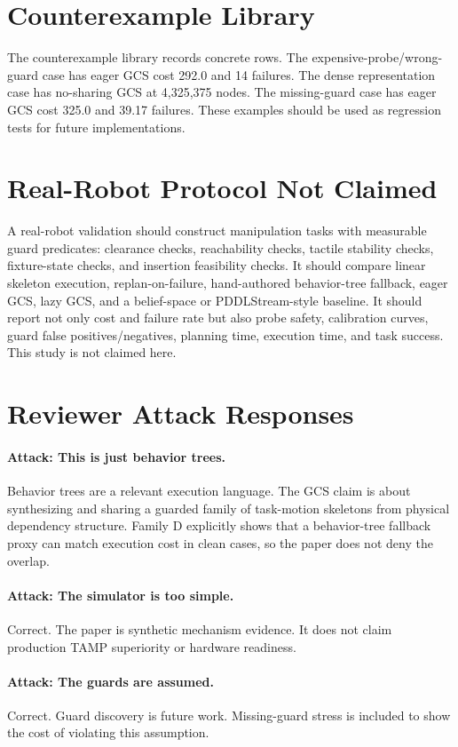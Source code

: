 \documentclass{article}
\begin{document}
\section{Counterexample Library}
The counterexample library records concrete rows. The expensive-probe/wrong-guard case has eager GCS cost 292.0 and 14 failures. The dense representation case has no-sharing GCS at 4,325,375 nodes. The missing-guard case has eager GCS cost 325.0 and 39.17 failures. These examples should be used as regression tests for future implementations.

\section{Real-Robot Protocol Not Claimed}
A real-robot validation should construct manipulation tasks with measurable guard predicates: clearance checks, reachability checks, tactile stability checks, fixture-state checks, and insertion feasibility checks. It should compare linear skeleton execution, replan-on-failure, hand-authored behavior-tree fallback, eager GCS, lazy GCS, and a belief-space or PDDLStream-style baseline. It should report not only cost and failure rate but also probe safety, calibration curves, guard false positives/negatives, planning time, execution time, and task success. This study is not claimed here.

\section{Reviewer Attack Responses}
\paragraph{Attack: This is just behavior trees.}
Behavior trees are a relevant execution language. The GCS claim is about synthesizing and sharing a guarded family of task-motion skeletons from physical dependency structure. Family D explicitly shows that a behavior-tree fallback proxy can match execution cost in clean cases, so the paper does not deny the overlap.

\paragraph{Attack: The simulator is too simple.}
Correct. The paper is synthetic mechanism evidence. It does not claim production TAMP superiority or hardware readiness.

\paragraph{Attack: The guards are assumed.}
Correct. Guard discovery is future work. Missing-guard stress is included to show the cost of violating this assumption.
\end{document}
